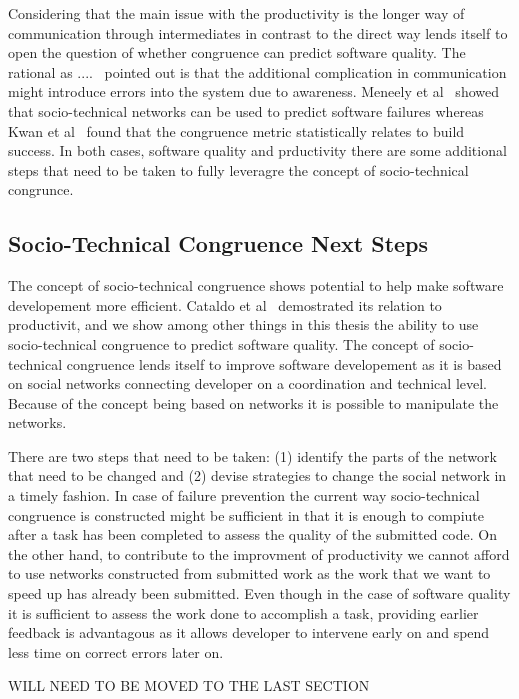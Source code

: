 Considering that the main issue with the productivity is the longer way of communication through intermediates in contrast to the direct way lends itself to open the question of whether congruence can predict software quality.
The rational as ....~\cite{} pointed out is that the additional complication in communication might introduce errors into the system due to awareness.
Meneely et al~\cite{meneely:fse:2008} showed that socio-technical networks can be used to predict software failures whereas Kwan et al~\cite{kwan:tse:2011} found that the congruence metric statistically relates to build success.
In both cases, software quality and prductivity there are some additional steps that need to be taken to fully leveragre the concept of socio-technical congrunce.

\subsection{Socio-Technical Congruence Next Steps}
The concept of socio-technical congruence shows potential to help make software developement more efficient.
Cataldo et al~\cite{cataldo:cscw:2006} demostrated its relation to productivit, and we show among other things in this thesis the ability to use socio-technical congruence to predict software quality.
The concept of socio-technical congruence lends itself to improve software developement as it is based on social networks connecting developer on a coordination and technical level.
Because of the concept being based on networks it is possible to manipulate the networks.

There are two steps that need to be taken:
(1) identify the parts of the network that need to be changed
and (2) devise strategies to change the social network in a timely fashion.
In case of failure prevention the current way socio-technical congruence is constructed might be sufficient in that it is enough to compiute after a task has been completed to assess the quality of the submitted code.
On the other hand, to contribute to the improvment of productivity we cannot afford to use networks constructed from submitted work as the work that we want to speed up has already been submitted.
Even though in the case of software quality it is sufficient to assess the work done to accomplish a task, providing earlier feedback is advantagous as it allows developer to intervene early on and spend less time on correct errors later on.

WILL NEED TO BE MOVED TO THE LAST SECTION

